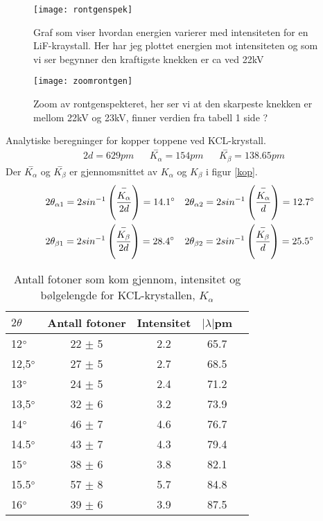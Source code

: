 \documentclass[norsk,a4paper,12pt]{article}
\begin{document}
\begin{figure}
	\begin{center}
  	\texttt{[image: rontgenspek]}\\
	\caption[Røntgenspektrum]{Graf som viser hvordan energien varierer med intensiteten for en LiF-kraystall. Her har jeg plottet energien mot intensiteten og som vi ser begynner den kraftigste knekken er ca ved 22kV}
	\label{rontgenspek}
	\end{center}
\end{figure}

\begin{figure}
	\begin{center}
  	\texttt{[image: zoomrontgen]}\\
	\caption[Zoom av røntgenspektrum]{Zoom av rontgenspekteret, her ser vi at den skarpeste knekken er mellom 22kV og 23kV, finner verdien fra tabell 1 side ?}
	\label{zoomront}
	\end{center}
\end{figure}

Analytiske beregninger for kopper toppene ved KCL-krystall.
\begin{align*}
&2d = 629pm && \overset{-}{K_\alpha} = 154 pm && \overset{-}{K_\beta} = 138.65 pm
\end{align*}
Der $\overset{-}{K_\alpha}$ og $\overset{-}{K_\beta}$ er gjennomsnittet av $K_\alpha$ og $K_\beta$ i figur \vref{kop}.
\begin{align*}
&2\theta_{\alpha1} = 2sin^{-1}\left(\frac{\overset{-}{K_\alpha}}{2d}\right) = 14.1\degree &&2\theta_{\alpha2} = 2sin^{-1}\left(\frac{\overset{-}{K_\alpha}}{d}\right) = 12.7\degree\\
&2\theta_{\beta1} = 2sin^{-1}\left(\frac{\overset{-}{K_\beta}}{2d}\right) = 28.4\degree
&&2\theta_{\beta2} = 2sin^{-1}\left(\frac{\overset{-}{K_\beta}}{d}\right) = 25.5\degree\\
\end{align*}


\begin{table}
\centering
\caption[$K_\alpha$]{Antall fotoner som kom gjennom, intensitet og bølgelengde for KCL-krystallen, $K_\alpha$ }
	\begin{tabular}{|l|c|c|c|c|}
	\hline
	$2\theta$ & Antall fotoner & Intensitet &  $|\lambda |$pm \\ 
	\hline
	12$\degree$ & 22 $\pm$ 5 & 2.2 & 65.7\\
	12,5$\degree$ & 27 $\pm$ 5 & 2.7 & 68.5 \\
	13$\degree$ & 24 $\pm$ 5 & 2.4 & 71.2 \\
	13,5$\degree$ & 32 $\pm$ 6 & 3.2 & 73.9 \\ 
	14$\degree$ & 46  $\pm$ 7 & 4.6 & 76.7 \\
	14.5$\degree$ & 43 $\pm$ 7 & 4.3 & 79.4 \\
	15$\degree$ & 38 $\pm$ 6 & 3.8 & 82.1 \\
	15.5$\degree$ & 57 $\pm$ 8 & 5.7 & 84.8 \\
	16$\degree$ & 39 $\pm$ 6 & 3.9 & 87.5 \\
	\hline
	\end{tabular}
\label{alpha}
\end{table}
\end{document}
